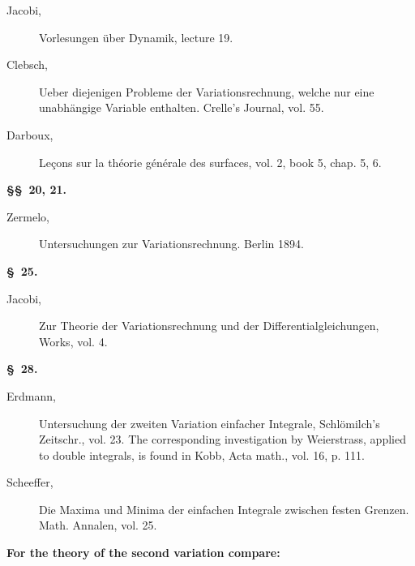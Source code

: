 \documentclass[11pt,a4paper,leqno]{article}
\begin{document}
\begin{description}
\item[Jacobi,] Vorlesungen über Dynamik, lecture 19.

\item[Clebsch,] Ueber diejenigen Probleme der Variationsrechnung, welche nur
eine unabhängige Variable enthalten. Crelle's Journal, vol. 55.

\item[Darboux,] Leçons sur la théorie générale des surfaces, vol. 2, book 5,
chap. 5, 6.
\end{description}

\begin{center}{\bfseries \S\S~20, 21.}\end{center}

\begin{description}
\item[Zermelo,] Untersuchungen zur Variationsrechnung. Berlin 1894.
\end{description}

\begin{center}{\bfseries \S~25.}\end{center}

\begin{description}
\item[Jacobi,] Zur Theorie der Variationsrechnung und der
Differentialgleichungen, Works, vol. 4.
\end{description}

\begin{center}{\bfseries \S~28.}\end{center}

\begin{description}
\item[Erdmann,] Untersuchung der zweiten Variation einfacher Integrale,
Schlömilch's Zeitschr., vol. 23. The corresponding investigation by
Weierstrass, applied to double integrals, is found in Kobb, Acta math.,
vol. 16, p. 111.

\item[Scheeffer,] Die Maxima und Minima der einfachen Integrale zwischen festen
Grenzen. Math. Annalen, vol. 25.
\end{description}

\begin{center}{\bfseries For the theory of the second variation compare:}\end{center}
\end{document}
